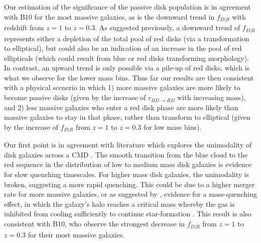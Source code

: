 \documentclass[useAMS,usenatbib]{mn2e}
\begin{document}
Our estimation of the significance of the passive disk population is in agreement with B10 for the most massive galaxies, as is the downward trend in $f_{D|R}$ with redshift from $z=1$ to $z=0.3$. As suggested previously, a downward trend of $f_{D|R}$ represents either a depletion of the total pool of red disks (via a transformation to elliptical), but could also be an indication of an increase in the pool of red ellipticals (which could result from blue or red disks transforming morphology). In contrast, an upward trend is only possible via a pile-up of red disks, which is what we observe for the lower mass bins. Thus far our results are then consistent with a physical scenerio in which 1) more massive galaxies are more likely to become passive disks (given by the increase of $r_{BD \rightarrow RD}$ with increasing mass), and 2) less massive galaxies who enter a red disk phase are more likely than massive galaxies to stay in that phase, rather than transform to elliptical (given by the increase of $f_{D|R}$ from $z=1$ to $z=0.3$ for low mass bins).

Our first point is in agreement with literature which explores the unimodality of disk galaxies across a CMD \citep{Schawinski2014,Powell2017}. The smooth transition from the blue cloud to the red sequence in the distribution of low to medium mass disk galaxies is evidence for slow quenching timescales. For higher mass disk galaxies, the unimodality is broken, suggesting a more rapid quenching. This could be due to a higher merger rate for more massive galaxies, or as suggested by \citet{Schawinski2014}, evidence for a mass-quenching effect, in which the galaxy's halo reaches a critical mass whereby the gas is inhibited from cooling sufficiently to continue star-formation \citep{Kormendy2004,Dekel2006,Peng2010}. This result is also consistent with B10, who observe the strongest decrease in $f_{D|R}$ from $z=1$ to $z=0.3$ for their most massive galaxies.
\end{document}
